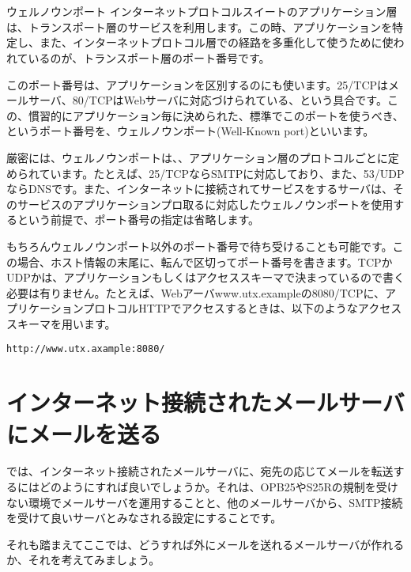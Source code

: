 {\section*{}
\begin{itembox}[l]{ウェルノウンポート}
インターネットプロトコルスイートのアプリケーション層は、トランスポート層のサービスを利用します。この時、アプリケーションを特定し、また、インターネットプロトコル層での経路を多重化して使うために使われているのが、トランスポート層のポート番号です。

このポート番号は、アプリケーションを区別するのにも使います。25/TCPはメールサーバ、80/TCPはWebサーバに対応づけられている、という具合です。この、慣習的にアプリケーション毎に決められた、標準でこのポートを使うべき、というポート番号を、ウェルノウンポート(Well-Known port)といいます。

厳密には、ウェルノウンポートは、、アプリケーション層のプロトコルごとに定められています。たとえば、25/TCPならSMTPに対応しており、また、53/UDPならDNSです。また、インターネットに接続されてサービスをするサーバは、そのサービスのアプリケーションプロ取るに対応したウェルノウンポートを使用するという前提で、ポート番号の指定は省略します。

もちろんウェルノウンポート以外のポート番号で待ち受けることも可能です。この場合、ホスト情報の末尾に、転んで区切ってポート番号を書きます。TCPかUDPかは、アプリケーションもしくはアクセススキーマで決まっているので書く必要は有りません。たとえば、Webアーバwww.utx.exampleの8080/TCPに、アプリケーションプロトコルHTTPでアクセスするときは、以下のようなアクセススキーマを用います。

\begin{verbatim}
http://www.utx.axample:8080/
\end{verbatim}

\end{itembox}

\section{インターネット接続されたメールサーバにメールを送る}

では、インターネット接続されたメールサーバに、宛先の応じてメールを転送するにはどのようにすれば良いでしょうか。それは、OPB25やS25Rの規制を受けない環境でメールサーバを運用することと、他のメールサーバから、SMTP接続を受けて良いサーバとみなされる設定にすることです。

それも踏まえてここでは、どうすれば外にメールを送れるメールサーバが作れるか、それを考えてみましょう。

}
